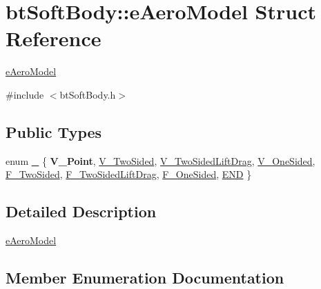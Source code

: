 \hypertarget{structbtSoftBody_1_1eAeroModel}{}\section{bt\+Soft\+Body\+:\+:e\+Aero\+Model Struct Reference}
\label{structbtSoftBody_1_1eAeroModel}


\hyperlink{structbtSoftBody_1_1eAeroModel}{e\+Aero\+Model}  




{\ttfamily \#include $<$bt\+Soft\+Body.\+h$>$}

\subsection*{Public Types}
\begin{DoxyCompactItemize}
\item 
enum \hyperlink{structbtSoftBody_1_1eAeroModel_a147f4e50f7cfaa2855b5ea5b4b2986ae}{\+\_\+} \{ \newline
{\bfseries V\+\_\+\+Point}, 
\hyperlink{structbtSoftBody_1_1eAeroModel_a147f4e50f7cfaa2855b5ea5b4b2986aea112eb2723581b443eb31003e75769ced}{V\+\_\+\+Two\+Sided}, 
\hyperlink{structbtSoftBody_1_1eAeroModel_a147f4e50f7cfaa2855b5ea5b4b2986aea91f6f6cec759e120ed1666ff684dae4a}{V\+\_\+\+Two\+Sided\+Lift\+Drag}, 
\hyperlink{structbtSoftBody_1_1eAeroModel_a147f4e50f7cfaa2855b5ea5b4b2986aea218d48cb6f6ce0640b193cc655ae05f7}{V\+\_\+\+One\+Sided}, 
\newline
\hyperlink{structbtSoftBody_1_1eAeroModel_a147f4e50f7cfaa2855b5ea5b4b2986aeaae33c1f5ebe9b125c044a4198b6ca3b4}{F\+\_\+\+Two\+Sided}, 
\hyperlink{structbtSoftBody_1_1eAeroModel_a147f4e50f7cfaa2855b5ea5b4b2986aeabf0ee1be501b9fc3aafd6055c2a54c48}{F\+\_\+\+Two\+Sided\+Lift\+Drag}, 
\hyperlink{structbtSoftBody_1_1eAeroModel_a147f4e50f7cfaa2855b5ea5b4b2986aea975eb119297b6320316ed0cac16db8e3}{F\+\_\+\+One\+Sided}, 
\hyperlink{structbtSoftBody_1_1eAeroModel_a147f4e50f7cfaa2855b5ea5b4b2986aea4b021d138b17f22f5e8fab9a253779f2}{E\+ND}
 \}
\end{DoxyCompactItemize}


\subsection{Detailed Description}
\hyperlink{structbtSoftBody_1_1eAeroModel}{e\+Aero\+Model} 

\subsection{Member Enumeration Documentation}
\mbox{\label{structbtSoftBody_1_1eAeroModel_a147f4e50f7cfaa2855b5ea5b4b2986ae}} 

